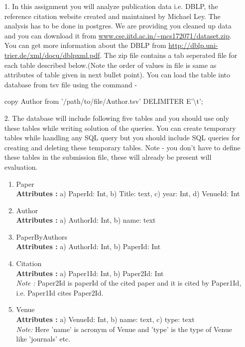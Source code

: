 \documentclass[10pt]{article}
\begin{document}
\begin{itemize}

\item[1.] In this assignment you will analyze publication data i.e. DBLP, the reference citation website created and maintained by Michael Ley. The analysis has to  be done in postgres. We are providing you cleaned up data and you can download it from  \url{www.cse.iitd.ac.in/~mcs172071/dataset.zip}. You can get more information about the DBLP from \url{http://dblp.uni-trier.de/xml/docu/dblpxml.pdf}. The zip file contains a tab seperated file for each table described below.(Note the order of values in file is same as attributes of table given in next bullet point). You can load the table into database from tsv file using the command - 

copy Author from '/path/to/file/Author.tsv' DELIMITER E'\textbackslash t';

\item[2.] The database will include following five tables and you should use only these tables while writing solution of the queries. You can create temporary tables while handling any SQL query but you should include SQL queries for creating and deleting these temporary tables. Note - you don't have to define these tables in the submission file, these will already be present will evaluation.

\begin{enumerate}
\item Paper\\
	\textbf{Attributes :}  a) PaperId: Int, b) Title: text, c) year: Int, d) VenueId: Int
\item Author\\
	\textbf{Attributes :} a) AuthorId: Int, b) name: text
	
\item PaperByAuthors\\
	\textbf{Attributes :} a) AuthorId: Int, b) PaperId: Int
	
\item Citation\\
	\textbf{Attributes :} a) Paper1Id: Int, b) Paper2Id: Int\\
\emph{Note :} Paper2Id is paperId of the cited paper and it is cited by Paper1Id, i.e. Paper1Id cites Paper2Id.

\item Venue\\
	\textbf{Attributes :} a) VenueId: Int, b) name: text, c) type: text\\
\emph{Note:} Here 'name' is acronym of Venue and 'type' is the type of Venue like 'journals' etc. 
\end{enumerate}

\end{itemize}
\end{document}
